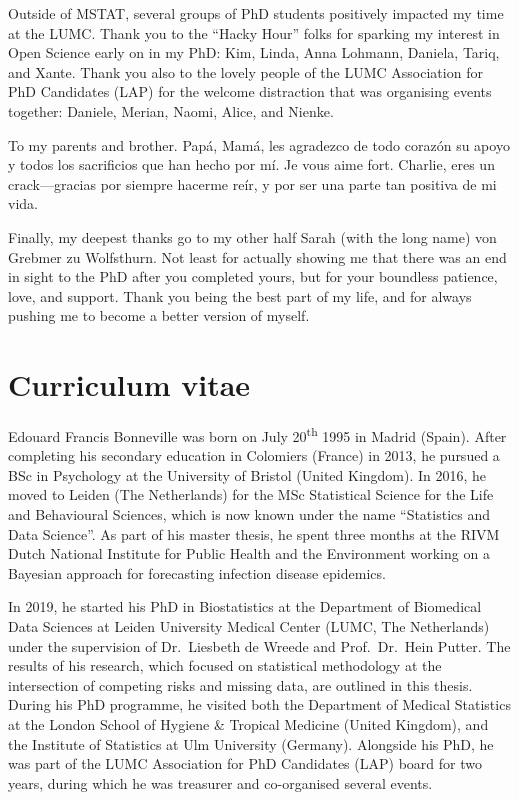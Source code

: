 \documentclass[
  letterpaper,
  paper=240mm:170mm,
  twoside=true,
  open=right,
  fontsize=10pt,
  pagesize=false,
  BCOR=15mm,
  DIV=14,
  headinclude=true,
  footinclude=false,
  headsepline=on]{scrbook}
\begin{document}
Outside of MSTAT, several groups of PhD students positively impacted my
time at the LUMC. Thank you to the ``Hacky Hour'' folks for sparking my
interest in Open Science early on in my PhD: Kim, Linda, Anna Lohmann,
Daniela, Tariq, and Xante. Thank you also to the lovely people of the
LUMC Association for PhD Candidates (LAP) for the welcome distraction
that was organising events together: Daniele, Merian, Naomi, Alice, and
Nienke.

To my parents and brother. Papá, Mamá, les agradezco de todo corazón su
apoyo y todos los sacrificios que han hecho por mí. Je vous aime fort.
Charlie, eres un crack---gracias por siempre hacerme reír, y por ser una
parte tan positiva de mi vida.

Finally, my deepest thanks go to my other half Sarah (with the long
name) von Grebmer zu Wolfsthurn. Not least for actually showing me that
there was an end in sight to the PhD after you completed yours, but for
your boundless patience, love, and support. Thank you being the best
part of my life, and for always pushing me to become a better version of
myself.


\chapter*{Curriculum vitae}\label{curriculum-vitae}


Edouard Francis Bonneville was born on July 20\textsuperscript{th} 1995
in Madrid (Spain). After completing his secondary education in Colomiers
(France) in 2013, he pursued a BSc in Psychology at the University of
Bristol (United Kingdom). In 2016, he moved to Leiden (The Netherlands)
for the MSc Statistical Science for the Life and Behavioural Sciences,
which is now known under the name ``Statistics and Data Science''. As
part of his master thesis, he spent three months at the RIVM Dutch
National Institute for Public Health and the Environment working on a
Bayesian approach for forecasting infection disease epidemics.

In 2019, he started his PhD in Biostatistics at the Department of
Biomedical Data Sciences at Leiden University Medical Center (LUMC, The
Netherlands) under the supervision of Dr.~Liesbeth de Wreede and
Prof.~Dr.~Hein Putter. The results of his research, which focused on
statistical methodology at the intersection of competing risks and
missing data, are outlined in this thesis. During his PhD programme, he
visited both the Department of Medical Statistics at the London School
of Hygiene \& Tropical Medicine (United Kingdom), and the Institute of
Statistics at Ulm University (Germany). Alongside his PhD, he was part
of the LUMC Association for PhD Candidates (LAP) board for two years,
during which he was treasurer and co-organised several events.
\end{document}
